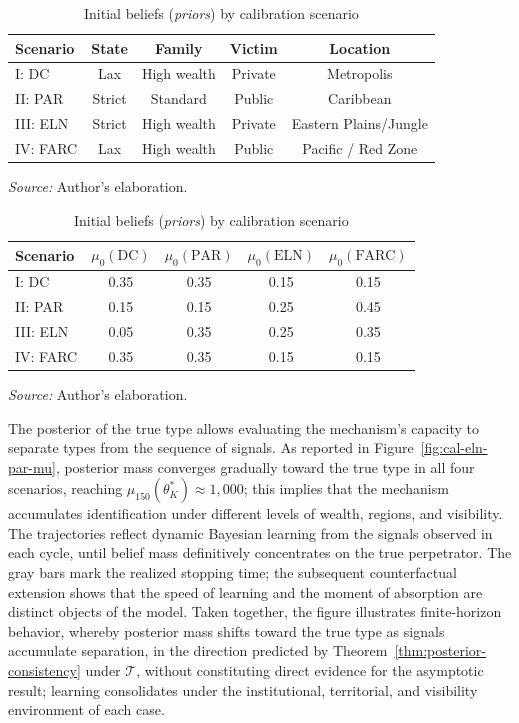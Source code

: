 \documentclass[review,authoryear,12pt]{elsarticle}
\theoremstyle{plain}
\theoremstyle{definition}
\newcommand{\1}{\mathbf{1}}
\begin{document}
\begin{table}[!ht]
\centering
\small
\caption{Parameters and covariates by calibration scenario}
\label{tab:covariables-escenarios}
\begin{tabular}{lcccc}
\toprule
Scenario & State & Family & Victim & Location \\ \midrule
I: DC & Lax & High wealth & Private & Metropolis \\
II: PAR & Strict & Standard & Public & Caribbean \\
III: ELN & Strict & High wealth & Private & Eastern Plains/Jungle \\
IV: FARC & Lax & High wealth & Public & Pacific / Red Zone \\ \bottomrule
\end{tabular}
\par\smallskip\footnotesize \textit{Source:} Author's elaboration.

\vspace{24pt}

\caption{Initial beliefs (\emph{priors}) by calibration scenario}
\label{tab:priors-escenarios}
\begin{tabular}{lcccc}
\toprule
Scenario & $\mu_0(\mathrm{DC})$ & $\mu_0(\mathrm{PAR})$ & $\mu_0(\mathrm{ELN})$ & $\mu_0(\mathrm{FARC})$ \\ \midrule
I: DC & 0.35 & 0.35 & 0.15 & 0.15 \\
II: PAR & 0.15 & 0.15 & 0.25 & 0.45 \\
III: ELN & 0.05 & 0.35 & 0.25 & 0.35 \\
IV: FARC & 0.35 & 0.35 & 0.15 & 0.15 \\ \bottomrule
\end{tabular}
\par\smallskip\footnotesize \textit{Source:} Author's elaboration.
\end{table}

The posterior of the true type allows evaluating the mechanism's capacity to separate types from the sequence of signals. As reported in Figure~\ref{fig:cal-eln-par-mu}, posterior mass converges gradually toward the true type in all four scenarios, reaching $\mu_{150}(\theta_K^\ast)\approx 1{,}000$; this implies that the mechanism accumulates identification under different levels of wealth, regions, and visibility. The trajectories reflect dynamic Bayesian learning from the signals observed in each cycle, until belief mass definitively concentrates on the true perpetrator. The gray bars mark the realized stopping time; the subsequent counterfactual extension shows that the speed of learning and the moment of absorption are distinct objects of the model. Taken together, the figure illustrates finite-horizon behavior, whereby posterior mass shifts toward the true type as signals accumulate separation, in the direction predicted by Theorem~\ref{thm:posterior-consistency} under $\mathcal{T}$, without constituting direct evidence for the asymptotic result; learning consolidates under the institutional, territorial, and visibility environment of each case.
\end{document}
